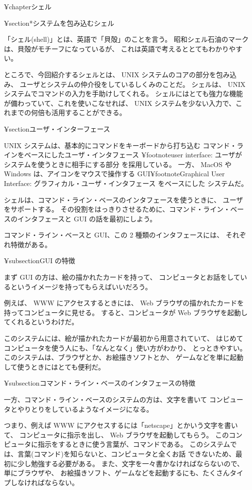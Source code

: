 ¥chapter{シェル}

¥section*{システムを包み込むシェル}

「シェル(shell)」とは、英語で「貝殻」のことを言う。
昭和シェル石油のマークは、貝殻がモチーフになっているが、
これは英語で考えるととてもわかりやすい。

ところで、今回紹介するシェルとは、 UNIX システムのコアの部分を包み込み、
ユーザとシステムの仲介役をしているしくみのことだ。
シェルは、 UNIX システムでコマンドの入力を手助けしてくれる。
シェルにはとても強力な機能が備わっていて、これを使いこなせれば、
 UNIX システムを少ない入力で、これまでの何倍も活用することができる。

¥section{ユーザ・インターフェース}

 UNIX システムは、基本的にコマンドをキーボードから打ち込む
コマンド・ラインをベースにしたユーザ・インタフェース
¥footnote{user interface: ユーザがシステムを使うときに相手にする部分}
を採用している。
一方、 MacOS や Windows は、アイコンをマウスで操作する GUI¥footnote{Graphical
User Interface: グラフィカル・ユーザ・インタフェース} をベースにした
システムだ。

シェルは、コマンド・ライン・ベースのインタフェースを使うときに、
ユーザをサポートする。
その役割をはっきりさせるために、コマンド・ライン・ベースのインタフェースと
 GUI の話を最初にしよう。

コマンド・ライン・ベースと GUI、この 2 種類のインタフェースには、
それぞれ特徴がある。

¥subsection{GUI の特徴}

まず GUI の方は、絵の描かれたカードを持って、
コンピュータとお話をしているというイメージを持ってもらえばいいだろう。

例えば、 WWW にアクセスするときには、 Web ブラウザの描かれたカードを
持ってコンピュータに見せる。
すると、コンピュータが Web ブラウザを起動してくれるというわけだ。

このシステムには、絵が描かれたカードが最初から用意されていて、
はじめてコンピュータを使う人にも、「なんとなく」使い方がわかり、
とっときやすい。
このシステムは、ブラウザとか、お絵描きソフトとか、
ゲームなどを単に起動して使うときにはとても便利だ。

¥subsection{コマンド・ライン・ベースのインタフェースの特徴}

一方、コマンド・ライン・ベースのシステムの方は、文字を書いて
コンピュータとやりとりをしているようなイメージになる。

つまり、例えば WWW にアクセスするには「netscape」とかいう文字を書いて、
コンピュータに指示を出し、 Web ブラウザを起動してもらう。
このコンピュータに指示をするときに使う言葉が、コマンドである。
このシステムでは、言葉(コマンド)を知らないと、コンピュータと全くお話
できないため、最初に少し勉強する必要がある。
また、文字を一々書かなければならないので、単にブラウザや、
お絵描きソフト、ゲームなどを起動するにも、たくさんタイプしなければならない。

